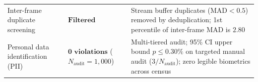 \begin{table}[!htbp]
\begin{tabularx}{\textwidth}{@{} >{\raggedright\arraybackslash}p{5.2cm} >{\raggedright\arraybackslash}p{4.0cm} >{\raggedright\arraybackslash}X @{}}
\addlinespace[1pt]
Inter-frame duplicate screening & $\mathbf{\text{Filtered}}$ & Stream buffer duplicates ($\text{MAD} < 0.5$) removed by deduplication; 1st percentile of inter-frame MAD is $2.80$ \\
\addlinespace[1pt]
Personal data identification (PII) & $\mathbf{0\text{ violations}}$ ($N_{\text{audit}} = 1,000$) & Multi-tiered audit; 95\% CI upper bound $p \le 0.30\%$ on targeted manual audit ($3/N_{\text{audit}}$); zero legible biometrics across census \\
\bottomrule
\end{tabularx}
\end{table}
